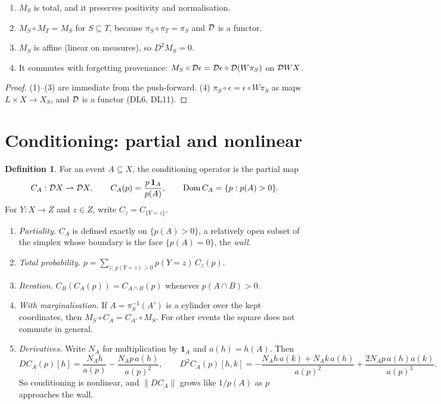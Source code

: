 \documentclass[11pt]{article}
\theoremstyle{definition}\newtheorem{definition}[theorem]{Definition}\newtheorem{remark}[theorem]{Remark}\newtheorem{example}[theorem]{Example}
\begin{document}
\begin{proposition}[marginalisation]\label{prop:marg}
\begin{enumerate}
\item[(1)] $M_S$ is total, and it preserves positivity and normalisation.
\item[(2)] $M_S\circ M_T=M_S$ for $S\subseteq T$, because $\pi_S\circ\pi_T=\pi_S$ and $\mathcal D$ is a functor.
\item[(3)] $M_S$ is affine (linear on measures), so $D^2M_S=0$.
\item[(4)] It commutes with forgetting provenance: $M_S\circ\mathcal D\epsilon=\mathcal D\epsilon\circ\mathcal D(W\pi_S)$ on $\mathcal D WX$.
\end{enumerate}
\end{proposition}

\begin{proof}
(1)--(3) are immediate from the push-forward. (4) $\pi_S\circ\epsilon=\epsilon\circ W\pi_S$ as maps $L\times X\to X_S$, and $\mathcal D$ is a functor
(DL6, DL11).
\end{proof}

\section{Conditioning: partial and nonlinear}\label{sec:cond}
\begin{definition}\label{def:cond}
For an event $A\subseteq X$, the conditioning operator is the partial map
\[
C_A:\mathcal D X\rightharpoonup\mathcal D X,\qquad C_A(p)=\frac{p\,\mathbf 1_A}{p(A)},\qquad\operatorname{Dom}C_A=\{p:p(A)>0\}.
\]
For $Y:X\to Z$ and $z\in Z$, write $C_z=C_{\{Y=z\}}$.
\end{definition}

\begin{proposition}[conditioning]\label{prop:cond}
\begin{enumerate}
\item[(1)] \emph{Partiality.} $C_A$ is defined exactly on $\{p(A)>0\}$, a relatively open subset of the simplex whose boundary is the
  face $\{p(A)=0\}$, the \emph{wall}.
\item[(2)] \emph{Total probability.} $p=\sum_{z:\,p(Y=z)>0}p(Y{=}z)\,C_z(p)$.
\item[(3)] \emph{Iteration.} $C_B(C_A(p))=C_{A\cap B}(p)$ whenever $p(A\cap B)>0$.
\item[(4)] \emph{With marginalisation.} If $A=\pi_S^{-1}(A')$ is a cylinder over the kept coordinates, then $M_S\circ C_A=C_{A'}\circ M_S$.
  For other events the square does not commute in general.
\item[(5)] \emph{Derivatives.} Write $N_A$ for multiplication by $\mathbf 1_A$ and $a(h)=h(A)$. Then
  \[
  DC_A(p)[h]=\frac{N_Ah}{a(p)}-\frac{N_Ap\,a(h)}{a(p)^2},\qquad
  D^2C_A(p)[h,k]=-\frac{N_Ah\,a(k)+N_Ak\,a(h)}{a(p)^2}+\frac{2N_Ap\,a(h)a(k)}{a(p)^3}.
  \]
  So conditioning is nonlinear, and $\|DC_A\|$ grows like $1/p(A)$ as $p$ approaches the wall.
\end{enumerate}
\end{proposition}
\end{document}
